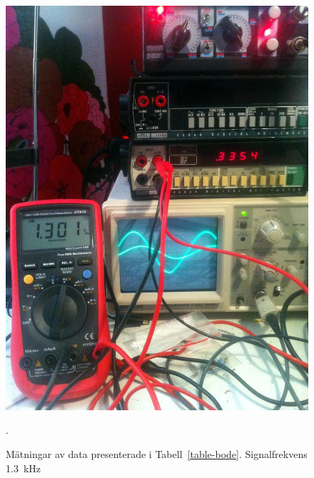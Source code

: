 \begin{figure}
  \centering
  \includegraphics[width=\linewidth]{img/bode_1300Hz.jpg}
  \caption[] {Mätningar av data presenterade i Tabell~\ref{table-bode}.
              Signalfrekvens \SI{1.3}{\kHz}}.
  \label{fig:bode-foto-1300}
\end{figure}

